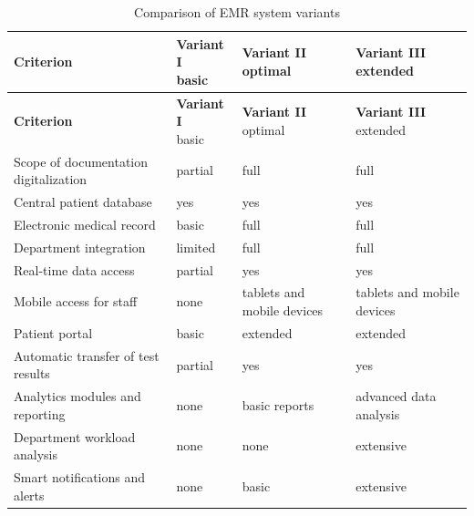 \begin{longtable}{|p{4cm}|p{3cm}|p{3cm}|p{3cm}|}

\caption{Comparison of EMR system variants}
\label{tab:warianty_emr} \\

\hline
\textbf{Criterion} &
\shortstack{\textbf{Variant I} \\ basic} &
\shortstack{\textbf{Variant II} \\ optimal} &
\shortstack{\textbf{Variant III} \\ extended} \\
\hline
\endfirsthead

\hline
\textbf{Criterion} &
\shortstack{\textbf{Variant I} \\ basic} &
\shortstack{\textbf{Variant II} \\ optimal} &
\shortstack{\textbf{Variant III} \\ extended} \\
\hline
\endhead

Scope of documentation digitalization &
partial &
full &
full \\
\hline

Central patient database &
yes &
yes &
yes \\
\hline

Electronic medical record &
basic &
full &
full \\
\hline

Department integration &
limited &
full &
full \\
\hline

Real-time data access &
partial &
yes &
yes \\
\hline

Mobile access for staff &
none &
tablets and mobile devices &
tablets and mobile devices \\
\hline

Patient portal &
basic &
extended &
extended \\
\hline

Automatic transfer of test results &
partial &
yes &
yes \\
\hline

Analytics modules and reporting &
none &
basic reports &
advanced data analysis \\
\hline

Department workload analysis &
none &
none &
extensive \\
\hline

Smart notifications and alerts &
none &
basic &
extensive \\
\hline


\end{longtable}
